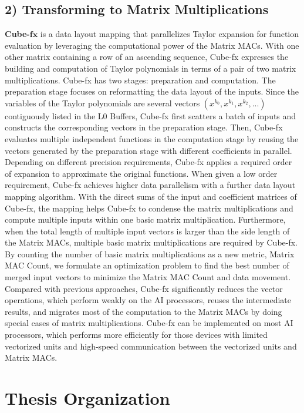 \documentclass[12pt]{extbook}
\begin{document}
\subsection{2) Transforming to Matrix Multiplications}

\textbf{Cube-}$\mathbf{fx}$ is a data layout mapping that parallelizes Taylor expansion for function evaluation by leveraging the computational power of the Matrix MACs. With one other matrix containing a row of an ascending sequence, Cube-fx expresses the building and computation of Taylor polynomials in terms of a pair of two matrix multiplications. Cube-fx has two stages: preparation and computation. The preparation stage focuses on reformatting the data layout of the inputs. Since the variables of the Taylor polynomials are several vectors $(x^{k_0}, x^{k_1}, x^{k_2}, ...)$ contiguously listed in the L0 Buffers, Cube-fx first scatters a batch of inputs and constructs the corresponding vectors in the preparation stage. Then, Cube-fx evaluates multiple independent functions in the computation stage by reusing the vectors generated by the preparation stage with different coefficients in parallel. Depending on different precision requirements, Cube-fx applies a required order of expansion to approximate the original functions. When given a low order requirement, Cube-fx achieves higher data parallelism with a further data layout mapping algorithm. With the direct sums of the input and coefficient matrices of Cube-fx, the mapping helps Cube-fx to condense the matrix multiplications and compute multiple inputs within one basic matrix multiplication. Furthermore, when the total length of multiple input vectors is larger than the side length of the Matrix MACs, multiple basic matrix multiplications are required by Cube-fx. By counting the number of basic matrix multiplications as a new metric, Matrix MAC Count, we formulate an optimization problem to find the best number of merged input vectors to minimize the Matrix MAC Count and data movement. Compared with previous approaches, Cube-fx significantly reduces the vector operations, which perform weakly on the AI processors, reuses the intermediate results, and migrates most of the computation to the Matrix MACs by doing special cases of matrix multiplications. Cube-fx can be implemented on most AI processors, which performs more efficiently for those devices with limited vectorized units and high-speed communication between the vectorized units and Matrix MACs.

\section{Thesis Organization}
\label{sec_1_4_organization}
\end{document}
